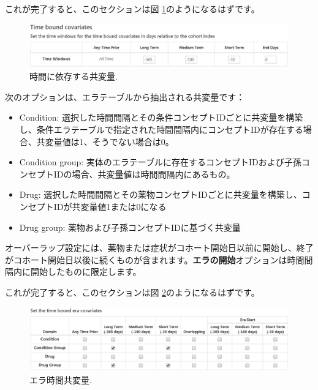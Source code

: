 \documentclass[
  11pt]{book}
\providecommand{\tightlist}{%
  \setlength{\itemsep}{0pt}\setlength{\parskip}{0pt}}
\theoremstyle{definition}
\theoremstyle{definition}
\theoremstyle{definition}
\theoremstyle{definition}
\theoremstyle{remark}
\begin{document}
これが完了すると、このセクションは図 \ref{fig:covariateSettings3}のようになるはずです。

\begin{figure}

{\centering \includegraphics[width=1\linewidth]{images/PatientLevelPrediction/covariateSettings3} 

}

\caption{時間に依存する共変量.}\label{fig:covariateSettings3}
\end{figure}

次のオプションは、エラテーブルから抽出される共変量です：

\begin{itemize}
\tightlist
\item
  Condition: 選択した時間間隔とその条件コンセプトIDごとに共変量を構築し、条件エラテーブルで指定された時間間隔内にコンセプトIDが存在する場合、共変量値は1、そうでない場合は0。
\item
  Condition group: 実体のエラテーブルに存在するコンセプトIDおよび子孫コンセプトIDの場合、共変量値は時間間隔内にあるもの。
\item
  Drug: 選択した時間間隔とその薬物コンセプトIDごとに共変量を構築し、コンセプトIDが共変量値1または0になる
\item
  Drug group: 薬物および子孫コンセプトIDに基づく共変量
\end{itemize}

オーバーラップ設定には、薬物または症状がコホート開始日以前に開始し、終了がコホート開始日以後に続くものが含まれます。\textbf{エラの開始}オプションは時間間隔内に開始したものに限定します。

これが完了すると、このセクションは図 \ref{fig:covariateSettings4}のようになるはずです。

\begin{figure}

{\centering \includegraphics[width=1\linewidth]{images/PatientLevelPrediction/covariateSettings4} 

}

\caption{エラ時間共変量.}\label{fig:covariateSettings4}
\end{figure}
\end{document}
